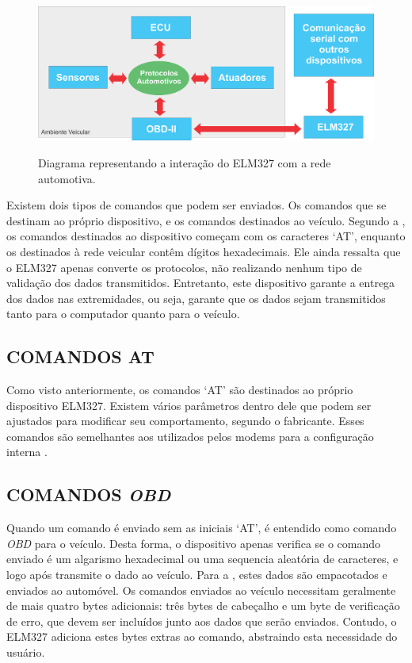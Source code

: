 \begin{figure}[!ht]
\centering
\caption{Diagrama representando a interação do ELM327 com a rede automotiva.} 
{\includegraphics[scale=.35]{imagens/arquiteturaRedeVeicularELM327.png}}\\
 \label{Fig:rede_veicular_elm327}
\end{figure}

Existem dois tipos de comandos que podem ser enviados. Os comandos que se destinam ao próprio dispositivo, e os comandos destinados ao veículo. Segundo a , os comandos destinados ao dispositivo começam com os caracteres ‘AT’, enquanto os destinados à rede veicular contêm dígitos hexadecimais. Ele ainda ressalta que o ELM327 apenas converte os protocolos, não realizando nenhum tipo de validação dos dados transmitidos. Entretanto, este dispositivo garante a entrega dos dados nas extremidades, ou seja, garante que os dados sejam transmitidos tanto para o computador quanto para o veículo.

\subsection{COMANDOS AT}
Como visto anteriormente, os comandos ‘AT’ são destinados ao próprio dispositivo ELM327. Existem vários parâmetros dentro dele que podem ser ajustados para modificar seu comportamento, segundo o fabricante. Esses comandos são semelhantes aos utilizados pelos modems para a configuração interna \cite{elmeletronics}.

\subsection{COMANDOS \textit{OBD}}
Quando um comando é enviado sem as iniciais ‘AT’, é entendido como comando \textit{OBD} para o veículo. Desta forma, o dispositivo apenas verifica se o comando enviado é um algarismo hexadecimal ou uma sequencia aleatória de caracteres, e logo após transmite o dado ao veículo. Para a , estes dados são empacotados e enviados ao automóvel. Os comandos enviados ao veículo necessitam geralmente de mais quatro bytes adicionais: três bytes de cabeçalho e um byte de verificação de erro, que devem ser incluídos junto aos dados que serão enviados. Contudo, o ELM327 adiciona estes bytes extras ao comando, abstraindo esta necessidade do usuário.

